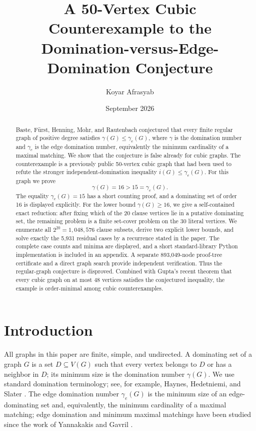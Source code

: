 \documentclass[11pt]{article}
\title{A 50-Vertex Cubic Counterexample to the\\Domination-versus-Edge-Domination Conjecture}
\author{Koyar Afrasyab}
\date{September 2026}
\theoremstyle{definition}
\theoremstyle{remark}
\begin{document}
\maketitle

\begin{abstract}
Baste, F\"urst, Henning, Mohr, and Rautenbach conjectured that every finite regular graph of positive degree satisfies
\(\gamma(G)\leq \gamma_e(G)\), where \(\gamma\) is the domination number and \(\gamma_e\) is the edge domination number, equivalently the minimum cardinality of a maximal matching.  We show that the conjecture is false already for cubic graphs.  The counterexample is a previously public 50-vertex cubic graph that had been used to refute the stronger independent-domination inequality \(i(G)\leq\gamma_e(G)\).  For this graph we prove
\[
\gamma(G)=16>15=\gamma_e(G).
\]
The equality \(\gamma_e(G)=15\) has a short counting proof, and a dominating set of order 16 is displayed explicitly.  For the lower bound \(\gamma(G)\geq16\), we give a self-contained exact reduction: after fixing which of the 20 clause vertices lie in a putative dominating set, the remaining problem is a finite set-cover problem on the 30 literal vertices.  We enumerate all \(2^{20}=1,048,576\) clause subsets, derive two explicit lower bounds, and solve exactly the 5,931 residual cases by a recurrence stated in the paper.  The complete case counts and minima are displayed, and a short standard-library Python implementation is included in an appendix.  A separate 893,049-node proof-tree certificate and a direct graph search provide independent verification.  Thus the regular-graph conjecture is disproved.  Combined with Gupta's recent theorem that every cubic graph on at most 48 vertices satisfies the conjectured inequality, the example is order-minimal among cubic counterexamples.
\end{abstract}

\section{Introduction}
All graphs in this paper are finite, simple, and undirected.  A dominating set of a graph $G$ is a set $D\subseteq V(G)$ such that every vertex belongs to $D$ or has a neighbor in $D$; its minimum size is the domination number $\gamma(G)$.  We use standard domination terminology; see, for example, Haynes, Hedetniemi, and Slater \cite{Haynes1998}.  The edge domination number $\gamma_e(G)$ is the minimum size of an edge-dominating set and, equivalently, the minimum cardinality of a maximal matching; edge domination and minimum maximal matchings have been studied since the work of Yannakakis and Gavril \cite{YannakakisGavril1980}.
\end{document}
